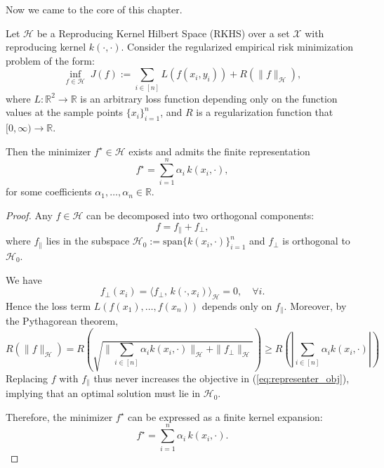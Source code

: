 \documentclass[../main]{subfiles}
\begin{document}
Now we came to the core of this chapter.
\begin{theorem}
    Let $\mathcal{H}$ be a Reproducing Kernel Hilbert Space (RKHS) over a set $\mathcal{X}$ with reproducing kernel $k(\cdot, \cdot)$.  
    Consider the regularized empirical risk minimization problem of the form:
    \begin{equation}
        \inf_{f \in \mathcal{H}} \; J(f)
        := \sum_{i\in[n]}L(f(x_i,y_i))+
        R( \|f\|_\mathcal H),
        \label{eq:representer_obj}
    \end{equation}
    where $L:\mathbb{R}^2 \to \mathbb{R}$ is an arbitrary loss function depending only on the function values at the sample points $\{x_i\}_{i=1}^n$, and $R$ is a regularization function that $[0,\infty)\to \mathbb R$.

    Then the minimizer $f^\star \in \mathcal{H}$ exists and admits the finite representation
    \begin{equation}
        f^\star = \sum_{i=1}^n \alpha_i\, k(x_i, \cdot),
    \end{equation}
    for some coefficients $\alpha_1, \dots, \alpha_n \in \mathbb{R}$.
\end{theorem}
\begin{proof}
    Any $f \in \mathcal{H}$ can be decomposed into two orthogonal components:
    \begin{equation}
        f = f_\parallel + f_\perp,
    \end{equation}
    where $f_\parallel$ lies in the subspace $\mathcal{H}_0 := \mathrm{span}\{k(x_i, \cdot)\}_{i=1}^n$
    and $f_\perp$ is orthogonal to $\mathcal{H}_0$.

    We have
    \begin{equation}
        f_\perp(x_i) = \langle f_\perp,\, k(\cdot, x_i) \rangle_{\mathcal{H}} = 0,
        \quad \forall i.
    \end{equation}
    Hence the loss term $L(f(x_1), \dots, f(x_n))$ depends only on $f_\parallel$.
    Moreover, by the Pythagorean theorem,
    \begin{equation}
        R(\|f\|_{\mathcal{H}})
        = R\left(\sqrt{\|\sum_{i\in[n]}\alpha_i k(x_i,\cdot)\|_{\mathcal{H}}+\|f_{\bot}\|_{\mathcal{H}}}\right)\ge R\left(|\sum_{i\in[n]}\alpha_i k(x_i,\cdot)|\right)
    \end{equation}
    Replacing $f$ with $f_\parallel$ thus never increases the objective in
    (\ref{eq:representer_obj}), implying that an optimal solution must lie in $\mathcal{H}_0$.

    Therefore, the minimizer $f^\star$ can be expressed as a finite kernel expansion:
    \begin{equation}
        f^\star = \sum_{i=1}^n \alpha_i\, k(x_i, \cdot).
    \end{equation}
\end{proof}
\end{document}
